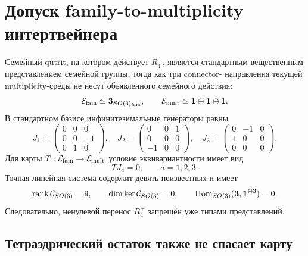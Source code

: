 \chapter{Допуск family-to-multiplicity интертвейнера}
\label{ch:v8-baryon-c0-family-to-multiplicity-intertwiner-admission-gate}

Семейный qutrit, на котором действует $R_4^+$, является стандартным
вещественным представлением семейной группы, тогда как три connector-
направления текущей multiplicity-среды не несут объявленного семейного
действия:
\begin{equation}
 \mathcal E_{\rm fam}\simeq\mathbf3_{SO(3)_{\rm fam}},
 \qquad
 \mathcal E_{\rm mult}\simeq\mathbf1\oplus\mathbf1\oplus\mathbf1.
 \label{eq:v8-baryon-c0-family-multiplicity-representation-types}
\end{equation}
В стандартном базисе инфинитезимальные генераторы равны
\begin{equation}
 J_1=\begin{pmatrix}0&0&0\\0&0&-1\\0&1&0\end{pmatrix},\quad
 J_2=\begin{pmatrix}0&0&1\\0&0&0\\-1&0&0\end{pmatrix},\quad
 J_3=\begin{pmatrix}0&-1&0\\1&0&0\\0&0&0\end{pmatrix}.
 \label{eq:v8-baryon-c0-family-so3-generators}
\end{equation}
Для карты $T:\mathcal E_{\rm fam}\to\mathcal E_{\rm mult}$ условие
эквивариантности имеет вид
\begin{equation}
 TJ_a=0,\qquad a=1,2,3.
 \label{eq:v8-baryon-c0-family-multiplicity-intertwiner-equations}
\end{equation}
Точная линейная система содержит девять неизвестных и имеет
\begin{equation}
 \operatorname{rank}\mathcal C_{SO(3)}=9,\qquad
 \dim\ker\mathcal C_{SO(3)}=0,\qquad
 \operatorname{Hom}_{SO(3)}(\mathbf3,\mathbf1^{\oplus3})=0.
 \label{eq:v8-baryon-c0-family-multiplicity-so3-hom-zero}
\end{equation}
Следовательно, ненулевой перенос $R_4^+$ запрещён уже типами
представлений.

\section{Тетраэдрический остаток также не спасает карту}

